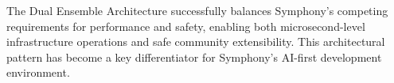 The Dual Ensemble Architecture successfully balances Symphony's competing requirements for performance and safety, enabling both microsecond-level infrastructure operations and safe community extensibility. This architectural pattern has become a key differentiator for Symphony's AI-first development environment.
